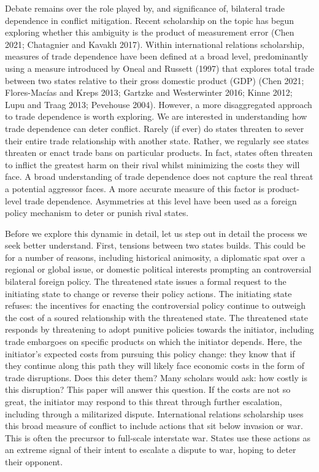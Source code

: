 \documentclass[
  letterpaper,
]{article}
\begin{document}
Debate remains over the role played by, and significance of, bilateral
trade dependence in conflict mitigation. Recent scholarship on the topic
has begun exploring whether this ambiguity is the product of measurement
error (Chen 2021; Chatagnier and Kavaklı 2017). Within international
relations scholarship, measures of trade dependence have been defined at
a broad level, predominantly using a measure introduced by Oneal and
Russett (1997) that explores total trade between two states relative to
their gross domestic product (GDP) (Chen 2021; Flores-Macías and Kreps
2013; Gartzke and Westerwinter 2016; Kinne 2012; Lupu and Traag 2013;
Pevehouse 2004). However, a more disaggregated approach to trade
dependence is worth exploring. We are interested in understanding how
trade dependence can deter conflict. Rarely (if ever) do states threaten
to sever their entire trade relationship with another state. Rather, we
regularly see states threaten or enact trade bans on particular
products. In fact, states often threaten to inflict the greatest harm on
their rival whilst minimizing the costs they will face. A broad
understanding of trade dependence does not capture the real threat a
potential aggressor faces. A more accurate measure of this factor is
product-level trade dependence. Asymmetries at this level have been used
as a foreign policy mechanism to deter or punish rival states.

Before we explore this dynamic in detail, let us step out in detail the
process we seek better understand. First, tensions between two states
builds. This could be for a number of reasons, including historical
animosity, a diplomatic spat over a regional or global issue, or
domestic political interests prompting an controversial bilateral
foreign policy. The threatened state issues a formal request to the
initiating state to change or reverse their policy actions. The
initiating state refuses: the incentives for enacting the controversial
policy continue to outweigh the cost of a soured relationship with the
threatened state. The threatened state responds by threatening to adopt
punitive policies towards the initiator, including trade embargoes on
specific products on which the initiator depends. Here, the initiator's
expected costs from pursuing this policy change: they know that if they
continue along this path they will likely face economic costs in the
form of trade disruptions. Does this deter them? Many scholars would
ask: how costly is this disruption? This paper will answer this
question. If the costs are not so great, the initiator may respond to
this threat through further escalation, including through a militarized
dispute. International relations scholarship uses this broad measure of
conflict to include actions that sit below invasion or war. This is
often the precursor to full-scale interstate war. States use these
actions as an extreme signal of their intent to escalate a dispute to
war, hoping to deter their opponent.
\end{document}
